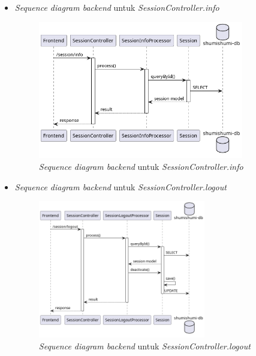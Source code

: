 \documentclass[a4paper]{article}
\begin{document}
\begin{enumerate}
\begin{enumerate}
\begin{itemize}
            \newpage
            \item \textit{Sequence diagram backend} untuk \textit{SessionController.info}
            \begin{figure}[h]
                \centering
                \includegraphics*[height=6cm]{diagram/sequence diagram/BE/session controller/info/info.png}
                \caption{\textit{Sequence diagram backend} untuk \textit{SessionController.info}}
            \end{figure}

            \item \textit{Sequence diagram backend} untuk \textit{SessionController.logout}
            \begin{figure}[h]
                \centering
                \includegraphics*[height=6cm]{diagram/sequence diagram/BE/session controller/logout/logout.png}
                \caption{\textit{Sequence diagram backend} untuk \textit{SessionController.logout}}
            \end{figure}


\end{itemize}
\end{enumerate}
\end{enumerate}
\end{document}
